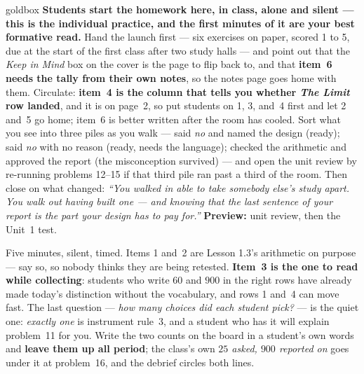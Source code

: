 \documentclass[10pt]{article}
\begin{document}
\boxguard
\begin{skillbox}{goldbox}
\textbf{Students start the homework here, in class, alone and silent --- this is the individual
practice, and the first minutes of it are your best formative read.} Hand the launch first ---
six exercises on paper, scored 1 to 5, due at the start of the first class after two study
halls --- and point out that the \emph{Keep in Mind} box on the cover is the page to flip back to,
and that \textbf{item~6 needs the tally from their own notes}, so the notes page goes home with
them. Circulate: \textbf{item~4 is the column that tells you whether \emph{The Limit} row landed},
and it is on page~2, so put students on 1, 3, and~4 first and let 2 and~5 go home; item~6 is
better written after the room has cooled. Sort what you see into three piles as you walk --- said
\emph{no} and named the design (ready); said \emph{no} with no reason (ready, needs the language);
checked the arithmetic and approved the report (the misconception survived) --- and open the unit
review by re-running problems 12--15 if that third pile ran past a third of the room. Then close
on what changed: \emph{``You walked in able to take somebody else's study apart. You walk out
having built one --- and knowing that the last sentence of your report is the part your design has
to pay for.''} \textbf{Preview:} unit review, then the Unit~1 test.
\end{skillbox}

\begin{teachernote}[Warm-Up]
Five minutes, silent, timed. Items 1 and~2 are Lesson 1.3's arithmetic on purpose --- say so, so
nobody thinks they are being retested. \textbf{Item~3 is the one to read while collecting}:
students who write $60$ and $900$ in the right rows have already made today's distinction without
the vocabulary, and rows 1 and~4 can move fast. The last question --- \emph{how many choices did
each student pick?} --- is the quiet one: \emph{exactly one} is instrument rule~3, and a student
who has it will explain problem~11 for you. Write the two counts on the board in a student's own
words and \textbf{leave them up all period}; the class's own \emph{$25$ asked, $900$ reported on}
goes under it at problem~16, and the debrief circles both lines.
\end{teachernote}
\end{document}
